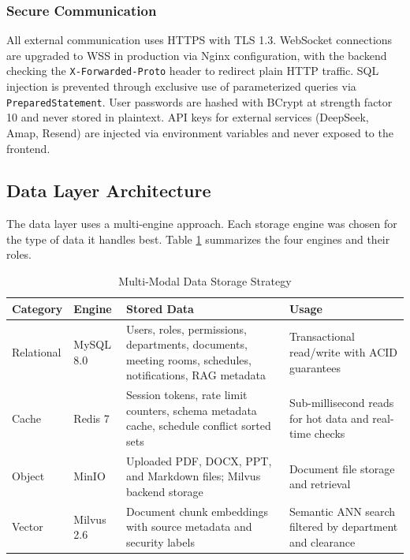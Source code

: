 \subsubsection{Secure Communication}

All external communication uses HTTPS with TLS 1.3. WebSocket connections are upgraded to WSS in production via Nginx configuration, with the backend checking the \texttt{X-Forwarded-Proto} header to redirect plain HTTP traffic. SQL injection is prevented through exclusive use of parameterized queries via \texttt{PreparedStatement}. User passwords are hashed with BCrypt at strength factor 10 and never stored in plaintext. API keys for external services (DeepSeek, Amap, Resend) are injected via environment variables and never exposed to the frontend.

\subsection{Data Layer Architecture}

The data layer uses a multi-engine approach. Each storage engine was chosen for the type of data it handles best. Table \ref{tab:data-storage} summarizes the four engines and their roles.

\begin{table}[H]
\small\singlespacing
\centering
\caption{Multi-Modal Data Storage Strategy}
\label{tab:data-storage}
\begin{tabularx}{\textwidth}{>{\RaggedRight\arraybackslash}p{}>{\RaggedRight\arraybackslash}p{}>{\RaggedRight\arraybackslash}p{}>{\RaggedRight\arraybackslash}X}
\toprule
\textbf{Category} & \textbf{Engine} & \textbf{Stored Data} & \textbf{Usage} \\
\midrule
Relational & MySQL 8.0 & Users, roles, permissions, departments, documents, meeting rooms, schedules, notifications, RAG metadata & Transactional read/write with ACID guarantees \\
Cache & Redis 7 & Session tokens, rate limit counters, schema metadata cache, schedule conflict sorted sets & Sub-millisecond reads for hot data and real-time checks \\
Object & MinIO & Uploaded PDF, DOCX, PPT, and Markdown files; Milvus backend storage & Document file storage and retrieval \\
Vector & Milvus 2.6 & Document chunk embeddings with source metadata and security labels & Semantic ANN search filtered by department and clearance \\
\bottomrule
\end{tabularx}
\end{table}

